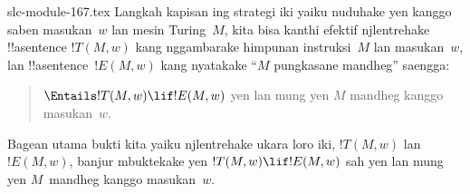 \begin{filecontents*}[overwrite]{slc-module-167.tex}
Langkah kapisan ing strategi iki yaiku nuduhake
yen kanggo saben masukan~$w$ lan mesin Turing~$M$,
kita bisa kanthi efektif njlentrehake
!!a{sentence} $!T(M, w)$ kang nggambarake
himpunan instruksi~$M$ lan masukan~$w$,
lan !!a{sentence}~$!E(M, w)$ kang nyatakake
``$M$ pungkasane mandheg'' saengga:
\begin{quote}
  $\Entails !T(M, w) \lif !E(M,w)$ yen lan mung yen $M$ mandheg kanggo masukan~$w$.
\end{quote}
Bagean utama bukti kita yaiku njlentrehake
ukara loro iki, $!T(M, w)$ lan~$!E(M, w)$,
banjur mbuktekake yen $!T(M, w) \lif !E(M, w)$
sah yen lan mung yen $M$~mandheg kanggo masukan~$w$.


\end{filecontents*}

